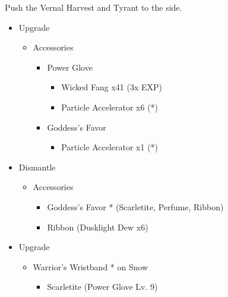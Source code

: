 \begin{multicols}{2}
Push the Vernal Harvest and Tyrant to the side.

\begin{upgrade}
\begin{itemize}
    \item Upgrade
    \begin{itemize}
        \item Accessories
        \begin{itemize}
            \item Power Glove
            \begin{itemize}
                \item Wicked Fang x41 (3x EXP)
                \item Particle Accelerator x6 (*)
            \end{itemize}
            \item Goddess's Favor
            \begin{itemize}
                \item Particle Accelerator x1 (*)
            \end{itemize}
        \end{itemize}
    \end{itemize}
    \item Dismantle
    \begin{itemize}
        \item Accessories
        \begin{itemize}
            \item Goddess's Favor * (Scarletite, Perfume, Ribbon)
            \item Ribbon (Dusklight Dew x6)
        \end{itemize}
    \end{itemize}
    \item Upgrade
    \begin{itemize}
        \item Warrior's Wristband * on Snow
        \begin{itemize}
            \item Scarletite (Power Glove Lv. 9)
        \end{itemize}
    \end{itemize}
\end{itemize}
\end{upgrade}
\end{multicols}
